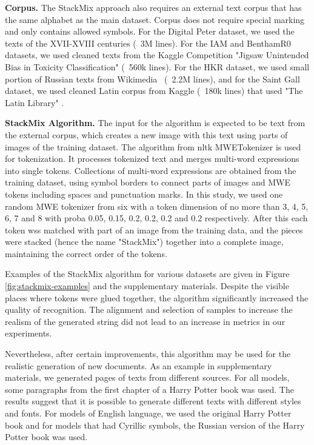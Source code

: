 \documentclass[10pt,twocolumn,letterpaper]{article}
\begin{document}
\medskip
\noindent 
\textbf{Corpus.} The StackMix approach also requires an external text corpus that has the same alphabet as the main dataset. Corpus does not require special marking and only contains allowed symbols. For the Digital Peter dataset, we used the texts of the XVII-XVIII centuries (~3M lines). For the IAM and BenthamR0 datasets, we used cleaned texts from the Kaggle Competition "Jigsaw Unintended Bias in Toxicity Classification" \cite{jigsaw} (~560k lines). For the HKR dataset, we used small portion of Russian texts from Wikimedia~\cite{ruwiki} (~2.2M lines), and for the Saint Gall dataset, we used cleaned Latin corpus from Kaggle \cite{kaggle_latin_library} (~180k lines) that used "The Latin Library" \cite{the_latin_library}.

\medskip
\noindent 
\textbf{StackMix Algorithm.} The input for the algorithm  is expected to be text from the external corpus, which creates a new image with this text using parts of images of the training dataset. The algorithm from nltk MWETokenizer \cite{nltkmwe} is used for tokenization. It processes tokenized text and merges multi-word expressions into single tokens. Collections of multi-word expressions are obtained from the training dataset, using symbol borders to connect parts of images and MWE tokens including spaces and punctuation marks. In this study, we used one random MWE tokenizer from six with a token dimension of no more than 3, 4, 5, 6, 7 and 8 with proba 0.05, 0.15, 0.2, 0.2, 0.2 and 0.2 respectively. After this each token wss matched with part of an image from the training data, and the pieces were stacked (hence the name "StackMix") together into a complete image, maintaining the correct order of the tokens.

Examples of the StackMix algorithm for various datasets are given in Figure \ref{fig:stackmix-examples} and the supplementary materials. Despite the visible places where tokens were glued together, the algorithm significantly increased the quality of recognition. The alignment and selection of samples to increase the realism of the generated string did not lead to an increase in metrics in our experiments. 

Nevertheless, after certain improvements, this algorithm may be used for the realistic generation of new documents. As an example in supplementary materials, we generated pages of texts from different sources. For all models, some paragraphs from the first chapter of a Harry Potter book was used. The results suggest that it is possible to generate different texts with different styles and fonts. For models of English language, we used the original Harry Potter book and for models that had Cyrillic symbols, the Russian version of the Harry Potter book was used.
\end{document}
